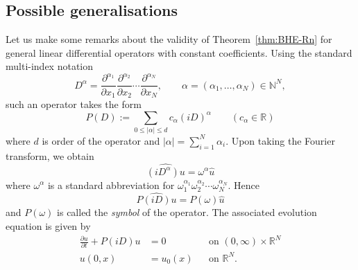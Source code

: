 \documentclass[a4paper, reqno]{amsart}
\numberwithin{equation}{section}
\theoremstyle{plain}
\theoremstyle{definition}
\theoremstyle{remark}
\newcommand{\NN}{\mathbb{N}}
\newcommand{\RR}{\mathbb{R}}
\begin{document}
\subsection{Possible generalisations}
\label{subsec:further}
Let us make some remarks about the validity of Theorem~\ref{thm:BHE-Rn} for general linear differential operators with constant coefficients. Using the standard multi-index notation
\begin{equation*}
  D^\alpha = \frac{\partial^{\alpha_1}}{\partial x_1} \frac{\partial^{\alpha_2}}{\partial x_2} \cdots \frac{\partial^{\alpha_N}}{\partial x_N},
  \qquad \alpha = (\alpha_1, \ldots, \alpha_N) \in \NN^N,
\end{equation*}
such an operator takes the form
\begin{equation*}
  P(D) := \sum_{0 \leq |\alpha| \leq d} c_\alpha (iD)^\alpha \qquad (c_\alpha \in \RR)
\end{equation*}
where $d$ is order of the operator and $|\alpha| = \sum_{i=1}^N \alpha_i$. Upon taking the Fourier transform, we obtain
\begin{equation*}
  \widehat{(iD^\alpha) u} = \omega^\alpha \widehat{u}
\end{equation*}
where $\omega^\alpha$ is a standard abbreviation for $\omega_1^{\alpha_1} \omega_2^{\alpha_2} \cdots \omega_N^{\alpha_N}$. Hence
\begin{equation*}
  \widehat{ P(iD)u } = P(\omega) \widehat{u}
\end{equation*}
and $P(\omega)$ is called the \emph{symbol} of the operator. The associated evolution equation is given by
\begin{equation}
  \label{eq:evol-gen}
  \begin{aligned}
    \frac{\partial u}{\partial t} + P(iD)u & = 0      &  & \text{on } (0, \infty) \times \RR^N \\
    u(0, x)                                & = u_0(x) &  & \text{on } \RR^N.
  \end{aligned}
\end{equation}
\end{document}
